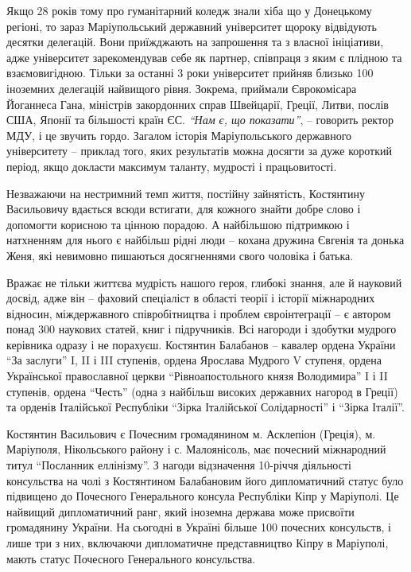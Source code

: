 
Якщо 28 років тому про гуманітарний коледж знали хіба що у Донецькому регіоні,
то зараз Маріупольський державний університет щороку відвідують десятки
делегацій. Вони приїжджають на запрошення та з власної ініціативи, адже
університет зарекомендував себе як партнер, співпраця з яким є плідною та
взаємовигідною. Тільки за останні 3 роки університет прийняв близько 100
іноземних делегацій найвищого рівня. Зокрема, приймали Єврокомісара Йоганнеса
Гана, міністрів закордонних справ Швейцарії, Греції, Литви, послів США, Японії
та більшості країн ЄС. \emph{\enquote{Нам є, що показати}}, – говорить ректор МДУ, і це
звучить гордо. Загалом історія Маріупольського державного університету –
приклад того, яких результатів можна досягти за дуже короткий період, якщо
докласти максимум таланту, мудрості і працьовитості.


Незважаючи на нестримний темп життя, постійну зайнятість, Костянтину
Васильовичу вдається всюди встигати, для кожного знайти добре слово і допомогти
корисною та цінною порадою. А найбільшою підтримкою і натхненням для нього є
найбільш рідні люди – кохана дружина Євгенія та донька Женя, які невимовно
пишаються досягненнями свого чоловіка і батька.

Вражає не тільки життєва мудрість нашого героя, глибокі знання, але й науковий
досвід, адже він – фаховий спеціаліст в області теорії і історії міжнародних
відносин, міждержавного співробітництва і проблем євроінтеграції – є автором
понад 300 наукових статей, книг і підручників. Всі нагороди і здобутки мудрого
керівника одразу і не порахуєш. Костянтин Балабанов – кавалер ордена України
\enquote{За заслуги} I, II і III ступенів, ордена Ярослава Мудрого V ступеня, ордена
Української православної церкви \enquote{Рівноапостольного князя Володимира} I і II
ступенів, ордена \enquote{Честь} (одна з найбільш високих державних нагород в Греції)
та орденів Італійської Республіки \enquote{Зірка Італійської Солідарності} і \enquote{Зірка
Італії}.


Костянтин Васильович є Почесним громадянином м. Асклепіон (Греція), м.
Маріуполя, Нікольського району і с. Малоянісоль, має почесний міжнародний титул
\enquote{Посланник еллінізму}. З нагоди відзначення 10-річчя діяльності консульства на
чолі з Костянтином Балабановим його дипломатичний статус було підвищено до
Почесного Генерального консула Республіки Кіпр у Маріуполі. Це найвищий
дипломатичний ранг, який іноземна держава може присвоїти громадянину України.
На сьогодні в Україні більше 100 почесних консульств, і лише три з них,
включаючи дипломатичне представництво Кіпру в Маріуполі, мають статус Почесного
Генерального консульства.

